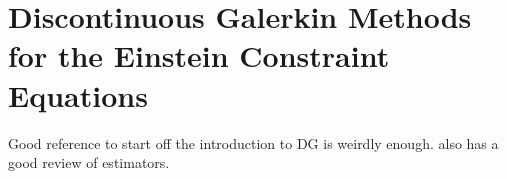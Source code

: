 \documentclass{ut-thesis}
\begin{document}
\section{Discontinuous Galerkin Methods for the Einstein Constraint Equations}

Good reference to start off the introduction to DG is \cite{stiller2016robust} weirdly enough.
\cite{bi2015posteriori} also has a good review of estimators.














\end{document}
